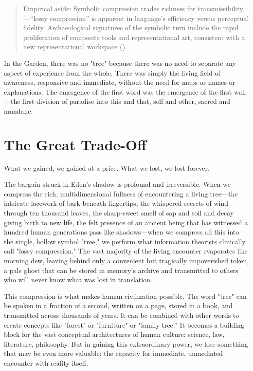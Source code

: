 \begin{quote}\small
Empirical aside: Symbolic compression trades richness for transmissibility—“lossy compression” is apparent in language’s efficiency versus perceptual fidelity. Archaeological signatures of the symbolic turn include the rapid proliferation of composite tools and representational art, consistent with a new representational workspace (\parencite{dunbar1996grooming}).
\end{quote}

In the Garden, there was no "tree" because there was no need to separate any aspect of experience from the whole. There was simply the living field of awareness, responsive and immediate, without the need for maps or names or explanations. The emergence of the first word was the emergence of the first wall—the first division of paradise into this and that, self and other, sacred and mundane.

\section{The Great Trade-Off}

What we gained, we gained at a price. What we lost, we lost forever.

The bargain struck in Eden's shadow is profound and irreversible. When we compress the rich, multidimensional fullness of encountering a living tree—the intricate lacework of bark beneath fingertips, the whispered secrets of wind through ten thousand leaves, the sharp-sweet smell of sap and soil and decay giving birth to new life, the felt presence of an ancient being that has witnessed a hundred human generations pass like shadows—when we compress all this into the single, hollow symbol "tree," we perform what information theorists clinically call "lossy compression." The vast majority of the living encounter evaporates like morning dew, leaving behind only a convenient but tragically impoverished token, a pale ghost that can be stored in memory's archive and transmitted to others who will never know what was lost in translation.

This compression is what makes human civilization possible. The word "tree" can be spoken in a fraction of a second, written on a page, stored in a book, and transmitted across thousands of years. It can be combined with other words to create concepts like "forest" or "furniture" or "family tree." It becomes a building block for the vast conceptual architectures of human culture: science, law, literature, philosophy. But in gaining this extraordinary power, we lose something that may be even more valuable: the capacity for immediate, unmediated encounter with reality itself.

